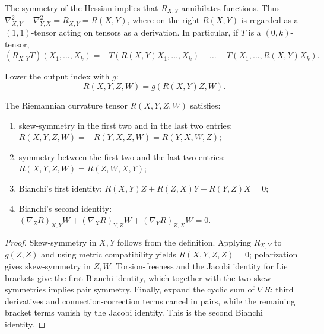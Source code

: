 \begin{remark}
  \label{rem:pet-ch3-ricci-identity-derivation}


  The symmetry of the Hessian implies that $R_{X,Y}$ annihilates functions. Thus
  $\nabla^2_{X,Y}-\nabla^2_{Y,X}=R_{X,Y}=R(X,Y)$, where on the right $R(X,Y)$ is
  regarded as a $(1,1)$-tensor acting on tensors as a derivation. In particular, if
  $T$ is a $(0,k)$-tensor,
  \[
    (R_{X,Y}T)(X_1,\dots,X_k)=-T(R(X,Y)X_1,\dots,X_k)-\dots-T(X_1,\dots,R(X,Y)X_k).
  \]
\end{remark}

\begin{definition}
  \label{def:pet-ch3-curvature-04-tensor}


  Lower the output index with $g$:
  \[
    R(X,Y,Z,W)=g(R(X,Y)Z,W).
  \]
\end{definition}

\begin{proposition}
  \label{prop:pet-ch3-curvature-symmetries}


  The Riemannian curvature tensor $R(X,Y,Z,W)$ satisfies:
  \begin{enumerate}
    \item[(1)] skew-symmetry in the first two and in the last two entries:
    $R(X,Y,Z,W)=-R(Y,X,Z,W)=R(Y,X,W,Z)$;
    \item[(2)] symmetry between the first two and the last two entries:
    $R(X,Y,Z,W)=R(Z,W,X,Y)$;
    \item[(3)] Bianchi's first identity: $R(X,Y)Z+R(Z,X)Y+R(Y,Z)X=0$;
    \item[(4)] Bianchi's second identity:
    $(\nabla_ZR)_{X,Y}W+(\nabla_XR)_{Y,Z}W+(\nabla_YR)_{Z,X}W=0$.
  \end{enumerate}
\end{proposition}
\begin{proof}

  \sketch
  Skew-symmetry in $X,Y$ follows from the definition. Applying
  $R_{X,Y}$ to $g(Z,Z)$ and using metric compatibility yields
  $R(X,Y,Z,Z)=0$; polarization gives skew-symmetry in $Z,W$.
  Torsion-freeness and the Jacobi identity for Lie brackets give the first
  Bianchi identity, which together with the two skew-symmetries implies pair
  symmetry. Finally, expand the cyclic sum of $\nabla R$: third derivatives and
  connection-correction terms cancel in pairs, while the remaining bracket terms
  vanish by the Jacobi identity. This is the second Bianchi identity.
\end{proof}

